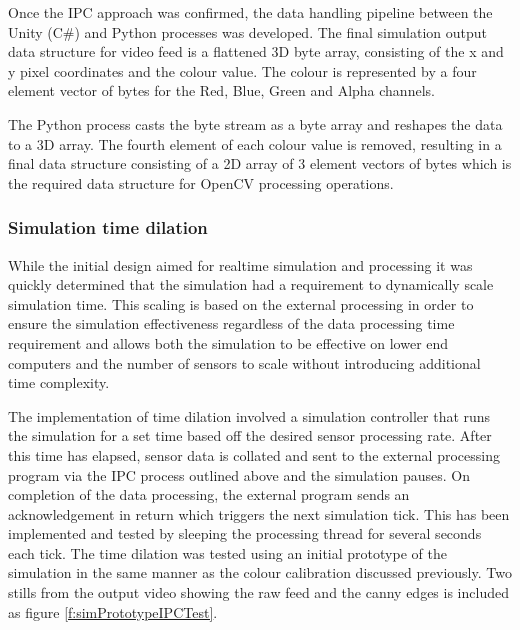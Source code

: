 \documentclass[]{aiaa-tc}%
\begin{document}
Once the IPC approach was confirmed, the data handling pipeline between the Unity (C\#) and Python processes was developed. The final simulation output data structure for video feed is a flattened 3D byte array, consisting of the x and y pixel coordinates and the colour value. The colour is represented by a four element vector of bytes for the Red, Blue, Green and Alpha channels. 

The Python process casts the byte stream as a byte array and reshapes the data to a 3D array. The fourth element of each colour value is removed, resulting in a final data structure consisting of a 2D array of 3 element vectors of bytes which is the required data structure for OpenCV processing operations. 

\subsubsection{Simulation time dilation}\label{sect:timedilation}

While the initial design aimed for realtime simulation and processing it was quickly determined that the simulation had a requirement to dynamically scale simulation time. This scaling is based on the external processing in order to ensure the simulation effectiveness regardless of the data processing time requirement and allows both the simulation to be effective on lower end computers and the number of sensors to scale without introducing additional time complexity.

The implementation of time dilation involved a simulation controller that runs the simulation for a set time based off the desired sensor processing rate. After this time has elapsed, sensor data is collated and sent to the external processing program via the IPC process outlined above and the simulation pauses. On completion of the data processing, the external program sends an acknowledgement in return which triggers the next simulation tick. This has been implemented and tested by sleeping the processing thread for several seconds each tick. The time dilation was tested using an initial prototype of the simulation in the same manner as the colour calibration discussed previously. Two stills from the output video showing the raw feed and the canny edges is included as figure \ref{f:simPrototypeIPCTest}.

\end{document}
